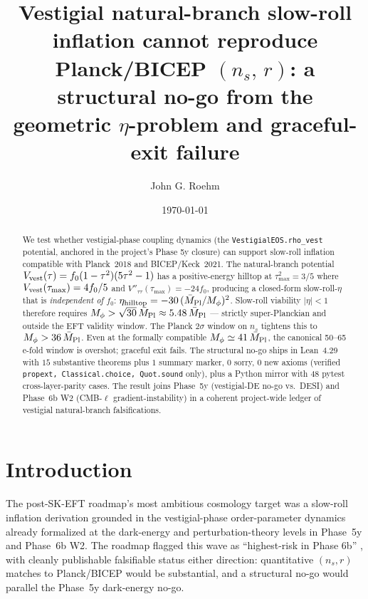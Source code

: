 \documentclass[twocolumn]{revtex4-2}
\newcommand{\Mpl}{\bar M_{\rm Pl}}
\newcommand{\Mphi}{M_\phi}
\newcommand{\fzero}{f_0}
\newcommand{\Vrho}{V_{\rm vest}}
\newcommand{\nS}{n_s}
\newcommand{\rT}{r}
\begin{document}
\title{Vestigial natural-branch slow-roll inflation cannot reproduce
Planck/BICEP $(n_s,\,r)$: a structural no-go from the geometric
$\eta$-problem and graceful-exit failure}

\author{John G. Roehm}

\date{\today}

\begin{abstract}
We test whether vestigial-phase coupling dynamics (the
\texttt{VestigialEOS.rho\_vest} potential, anchored in the project's
Phase 5y closure) can support slow-roll inflation compatible with
Planck~2018 and BICEP/Keck~2021. The natural-branch potential
$\Vrho(\tau) = \fzero (1-\tau^2)(5\tau^2-1)$ has a
positive-energy hilltop at $\tau_{\max}^2 = 3/5$ where
$\Vrho(\tau_{\max}) = 4\fzero/5$ and $V''_{\tau\tau}(\tau_{\max}) = -24\fzero$,
producing a closed-form slow-roll-$\eta$ that is
\emph{independent of $\fzero$}: $\eta_{\rm hilltop} = -30\,(\Mpl/\Mphi)^2$.
Slow-roll viability $|\eta|<1$ therefore requires
$\Mphi > \sqrt{30}\,\Mpl \approx 5.48\,\Mpl$ — strictly super-Planckian
and outside the EFT validity window. The Planck $2\sigma$ window on $\nS$
tightens this to $\Mphi > 36\,\Mpl$. Even at the formally compatible
$\Mphi \simeq 41\,\Mpl$, the canonical 50--65 e-fold window is overshot;
graceful exit fails. The structural no-go ships in Lean~4.29 with $15$
substantive theorems plus $1$ summary marker, $0$ sorry, $0$ new axioms
(verified \texttt{propext, Classical.choice, Quot.sound} only), plus a
Python mirror with $48$ pytest cross-layer-parity cases. The result joins
Phase~5y (vestigial-DE no-go vs.\ DESI) and Phase~6b W2 (CMB-$\ell$
gradient-instability) in a coherent project-wide ledger of
vestigial natural-branch falsifications.
\end{abstract}

\maketitle

\section{Introduction}

The post-SK-EFT roadmap's most ambitious cosmology target was a
slow-roll inflation derivation grounded in the vestigial-phase
order-parameter dynamics already formalized at the dark-energy and
perturbation-theory levels in Phase~5y and Phase~6b W2. The roadmap
flagged this wave as ``highest-risk in Phase 6b'' \cite{Phase6bRoadmap},
with cleanly publishable falsifiable status either direction:
quantitative $(\nS, \rT)$ matches to Planck/BICEP would be substantial,
and a structural no-go would parallel the Phase~5y dark-energy no-go.
\end{document}
